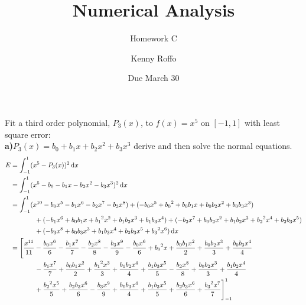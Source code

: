\documentclass{scrartcl}
\title{Numerical Analysis}
\subtitle{Homework C}
\author{Kenny Roffo}
\date{Due March 30}
\begin{document}
\maketitle

Fit a third order polynomial, $P_3(x)$, to $f(x)=x^5$ on $[-1,1]$ with least square error:\\

\textbf{a)}$P_3(x)=b_0+b_1x+b_2x^2+b_3x^3$ derive and then solve the normal equations.\\

\begin{align*}
E&=\int_{-1}^{1}(x^5-P_3(x))^2\dif{x}\\
&=\int_{-1}^{1}(x^5-b_0-b_1x-b_2x^2-b_3x^3)^2\dif{x}\\
&=\int_{-1}^{1}(x^{10}-b_0x^5-b_1x^6-b_2x^7-b_3x^8)+(-b_0x^5+{b_0}^2+b_0b_1x+b_0b_2x^2+b_0b_3x^3)\\
&\hspace{0.5 in}+(-b_1x^6+b_0b_1x+{b_1}^2x^2+b_1b_2x^3+b_1b_3x^4)+(-b_2x^7+b_0b_2x^2+b_1b_2x^3+{b_2}^2x^4+b_2b_3x^5)\\
&\hspace{0.5 in}+(-b_3x^8+b_0b_3x^3+b_1b_3x^4+b_2b_3x^5+{b_3}^2x^6)\dif{x}\\
&=\Bigg[\frac{x^{11}}{11}-\frac{b_0x^6}{6}-\frac{b_1x^7}{7}-\frac{b_2x^8}{8}-\frac{b_3x^9}{9}-\frac{b_0x^6}{6}+{b_0}^2x+\frac{b_0b_1x^2}{2}+\frac{b_0b_2x^3}{3}+\frac{b_0b_3x^4}{4}\\
&\hspace{0.5 in}-\frac{b_1x^7}{7}+\frac{b_0b_1x^2}{2}+\frac{{b_1}^2x^3}{3}+\frac{b_1b_2x^4}{4}+\frac{b_1b_3x^5}{5}-\frac{b_2x^8}{8}+\frac{b_0b_2x^3}{3}+\frac{b_1b_2x^4}{4}\\
&\hspace{0.5 in}+\frac{{b_2}^2x^5}{5}+\frac{b_2b_3x^6}{6}-\frac{b_3x^9}{9}+\frac{b_0b_3x^4}{4}+\frac{b_1b_3x^5}{5}+\frac{b_2b_3x^6}{6}+\frac{{b_3}^2x^7}{7}\Bigg]_{-1}^1\\
\end{align*}
\end{document}
